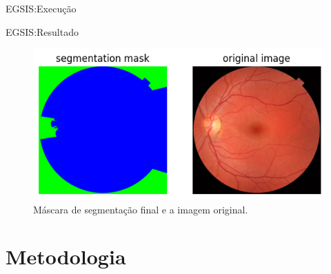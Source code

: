 \documentclass{templatebeamerufc/libs/ufc_format}
\begin{document}
\begin{frame}{EGSIS:\@ Execução}
\end{frame}

\begin{frame}{EGSIS:\@ Resultado}
  \begin{figure}[h!]
    \centering
    \caption{\label{fig:egsis-mask}
      Máscara de segmentação final e a imagem original.\@
    }
    \includegraphics[scale=0.7]{figuras/egsis-segmentation-mask}
  \end{figure}
\end{frame}

\section{Metodologia}

\end{document}
